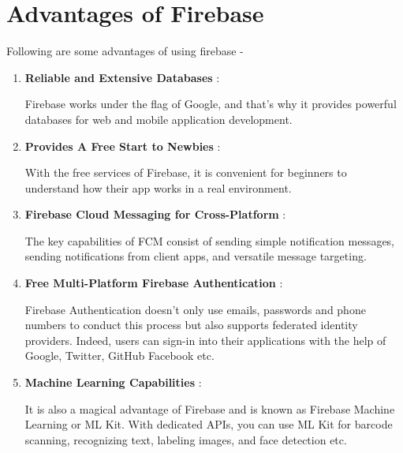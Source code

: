\documentclass[12pt,a4paper]{report}
\begin{document}
\section{{\fontsize{16}{0}\selectfont Advantages of Firebase}}
{\fontsize{14}{0}\selectfont
\noindent
Following are some advantages of using firebase -
 
\vspace{.5cm}

\begin{enumerate}
  \item  \textbf{Reliable and Extensive Databases} :
  
  Firebase works under the flag of Google, and that’s why it provides powerful databases for web and mobile application development.
  \item  \textbf{Provides A Free Start to Newbies} :
  
    With the free services of Firebase, it is convenient for beginners to understand how their app works in a real environment.
  \item  \textbf{Firebase Cloud Messaging for Cross-Platform} :
  
    The key capabilities of FCM consist of sending simple notification messages, sending notifications from client apps, and versatile message targeting.
  \item  \textbf{Free Multi-Platform Firebase Authentication} :
  
    Firebase Authentication doesn’t only use emails, passwords and phone numbers to conduct this process but also supports federated identity providers. Indeed, users can sign-in into their applications with the help of Google, Twitter, GitHub Facebook etc.
  \item  \textbf{Machine Learning Capabilities} :
  
   It is also a magical advantage of Firebase and is known as Firebase Machine Learning or ML Kit. With dedicated \ac{API}s, you can use \ac{ML} Kit for barcode scanning, recognizing text, labeling images, and face detection etc.



  
\end{enumerate}
}
\end{document}

